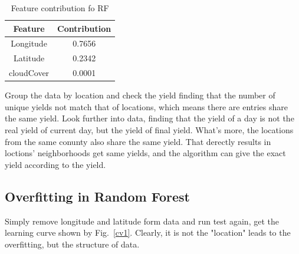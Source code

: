 \documentclass[conference]{IEEEtran}
\begin{document}
\begin{table}[htbp]
    \caption{Feature contribution fo RF}
    \begin{center}
    \begin{tabular}{|c|c|}
    \hline
      Feature & Contribution \\
    \hline
      Longitude & 0.7656 \\
      Latitude & 0.2342 \\
      cloudCover & 0.0001 \\
    \hline
    \end{tabular}
    \label{tab:RF_contribution}
    \end{center}
\end{table}

Group the data by location and check the yield finding that the number of unique yields not match that of locations, which means there are entries share the same yield. Look further into data, finding that the yield of a day is not the real yield of current day, but the yield of final yield. What's more, the locations from the same conunty also share the same yield. That derectly results in loctions' neighborhoods get same yields, and the algorithm can give the exact yield according to the yield. 

\subsection{Overfitting in Random Forest}
Simply remove longitude and latitude form data and run test again, get the learning curve shown by Fig.~\ref{cv1}. Clearly, it is not the "location" leads to the overfitting, but the structure of data.
\end{document}
